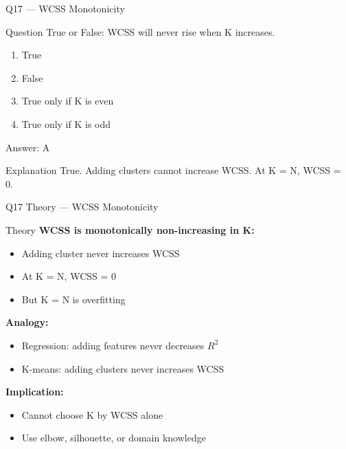 \documentclass[aspectratio=169,8pt]{beamer}
\begin{document}
	\begin{frame}{Q17 --- WCSS Monotonicity}
		\begin{block}{Question}
			True or False: WCSS will never rise when K increases.
		\end{block}
		\begin{enumerate}[label=\Alph*.]
			\item True
			\item False
			\item True only if K is even
			\item True only if K is odd
		\end{enumerate}
		\begin{exampleblock}{Answer: A}
		\end{exampleblock}
		\begin{block}{Explanation}
			True. Adding clusters cannot increase WCSS. At K = N, WCSS = 0.
		\end{block}
	\end{frame}
	
	\begin{frame}{Q17 Theory --- WCSS Monotonicity}
		\begin{block}{Theory}
			\textbf{WCSS is monotonically non-increasing in K:}
			\begin{itemize}
				\item Adding cluster never increases WCSS
				\item At K = N, WCSS = 0
				\item But K = N is overfitting
			\end{itemize}
			\textbf{Analogy:}
			\begin{itemize}
				\item Regression: adding features never decreases $R^2$
				\item K-means: adding clusters never increases WCSS
			\end{itemize}
			\textbf{Implication:}
			\begin{itemize}
				\item Cannot choose K by WCSS alone
				\item Use elbow, silhouette, or domain knowledge
			\end{itemize}
		\end{block}
	\end{frame}
	
\end{document}
